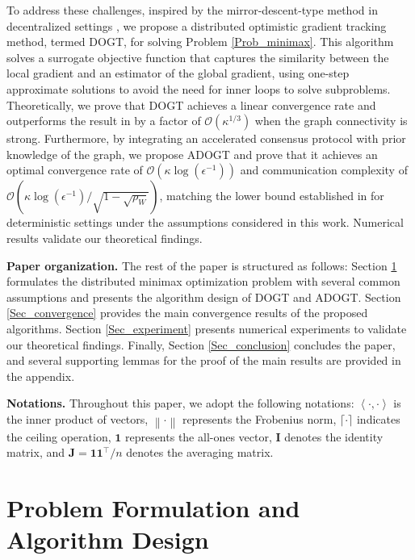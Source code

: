 \documentclass[10pt,a4paper]{amsart}
\begin{document}
To address these challenges, inspired by the mirror-descent-type method in decentralized settings \cite{sonata, beznosikov2021distributed}, we propose a distributed optimistic gradient tracking method, termed DOGT, for solving Problem \eqref{Prob_minimax}. This algorithm solves a surrogate objective function that captures the similarity between the local gradient and an estimator of the global gradient, using one-step approximate solutions to avoid the need for inner loops to solve subproblems. Theoretically, we prove that DOGT achieves a linear convergence rate and outperforms the result in \cite{mukherjee2020decentralized} by a factor of $\mathcal{O} \left( \kappa ^{1/3} \right) $ when the graph connectivity is strong. Furthermore, by integrating an accelerated consensus protocol with prior knowledge of the graph, we propose ADOGT and prove that it achieves an optimal convergence rate of $\mathcal{O} \left( \kappa \log \left( \epsilon ^{-1} \right) \right)$ and communication complexity of $\mathcal{O} \left( \kappa \log \left( \epsilon ^{-1} \right) /\sqrt{1-\sqrt{\rho _W}} \right)$, matching the lower bound established in \cite{beznosikov2020distributed} for deterministic settings under the assumptions considered in this work. Numerical results validate our theoretical findings.

\textbf{Paper organization.} The rest of the paper is structured as follows: Section \ref{Sec_prob_algorithm} formulates the distributed minimax optimization problem with several common assumptions and presents the algorithm design of DOGT and ADOGT. Section \ref{Sec_convergence} provides the main convergence results of the proposed algorithms. Section \ref{Sec_experiment} presents numerical experiments to validate our theoretical findings. Finally, Section \ref{Sec_conclusion} concludes the paper, and several supporting lemmas for the proof of the main results are provided in the appendix.

\textbf{Notations.} Throughout this paper, we adopt the following notations: $\left< \cdot ,\cdot \right> $ is the inner product of vectors, $\left\| \cdot \right\|$ represents the Frobenius norm, $\lceil \cdot \rceil$ indicates the ceiling operation, $\mathbf{1}$ represents the all-ones vector, $\mathbf{I}$ denotes the identity matrix, and $\mathbf{J}=\mathbf{1}\mathbf{1}^{\top}/n$ denotes the averaging matrix. 




\section{Problem Formulation and Algorithm Design}\label{Sec_prob_algorithm}
\end{document}
